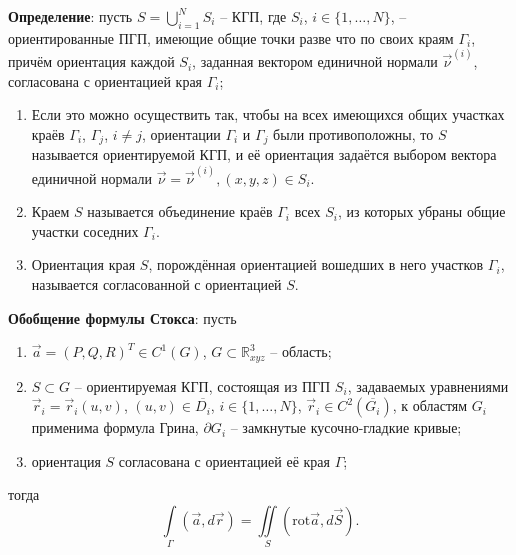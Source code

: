 \documentclass[12pt, a4paper, reqno]{article}
\begin{document}
    \textbf{Определение}: пусть $S = \bigcup\limits_{i = 1}^{N} S_i$ -- КГП, где $S_i$,
    $i \in \{1, \ldots, N\}$, -- ориентированные ПГП, имеющие общие точки разве что по своих краям
    $\Gamma_i$, причём ориентация каждой $S_i$, заданная вектором единичной нормали $\vec{\nu}^{(i)}$,
    согласована с ориентацией края $\Gamma_i$;
    \begin{enumerate}
        \item Если это можно осуществить так, чтобы на всех имеющихся общих участках краёв
              $\Gamma_i$, $\Gamma_j$, $i \neq j$, ориентации $\Gamma_i$ и $\Gamma_j$ были
              противоположны, то $S$ называется ориентируемой КГП, и её ориентация задаётся выбором
              вектора единичной нормали $\vec{\nu} = \vec{\nu}^{(i)}, (x, y, z) \in S_i$.
        \item Краем $S$ называется объединение краёв $\Gamma_i$ всех $S_i$, из которых убраны общие
              участки соседних $\Gamma_i$.
        \item Ориентация края $S$, порождённая ориентацией вошедших в него участков $\Gamma_i$,
              называется согласованной с ориентацией $S$.
    \end{enumerate}

    \textbf{Обобщение формулы Стокса}: пусть
    \begin{enumerate}
        \item $\vec{a} = (P, Q, R)^T \in C^1(G)$, $G \subset \mathbb{R}_{xyz}^3$ -- область;
        \item $S \subset G$ -- ориентируемая КГП, состоящая из ПГП $S_i$, задаваемых уравнениями
              $\vec{r}_i = \vec{r}_i(u, v)$, $(u, v) \in \overline{D_i}$, $i \in \{1, \ldots, N\}$,
              $\vec{r}_i \in C^2(\overline{G_i})$, к областям $G_i$ применима формула Грина,
              $\partial G_i$ -- замкнутые кусочно-гладкие кривые;
        \item ориентация $S$ согласована с ориентацией её края $\Gamma$;
    \end{enumerate}
    тогда
    \begin{equation*}
        \int\limits_{\Gamma} (\vec{a}, d\vec{r}) = \iint\limits_{S} (\text{rot}\vec{a}, d\vec{S}).
    \end{equation*}
\end{document}
